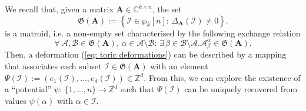 \documentclass[10pt]{article}
\theoremstyle{remark}%
\theoremstyle{definition}%
\begin{document}
We recall that, given a matrix $\mathbf{A}\in\mathbb{C}^{k\times n}$, the set 
 \begin{equation}
\mathfrak{G}(\mathbf{A}):=\left\{ \mathcal{I}\in\wp_{k}[n]:\,\Delta_{\mathbf{A}}(\mathcal{I})\neq0\right\}.
\label{eq: set of non-vanishing minors}
 \end{equation}
is a matroid, i.e. a non-empty set characterised by the following exchange relation \citep{Oxley2006} 
 \begin{equation}
\forall\,\mathcal{A},\mathcal{B}\in\mathfrak{G}(\mathbf{A}),\,\alpha\in\mathcal{A}\setminus\mathcal{B}:\,\exists\,\beta\in\mathcal{B}\setminus\mathcal{A}.\mathcal{A}_{\beta}^{\alpha}\in\mathfrak{G}(\mathbf{A}).
\label{eq: exchange relation}
 \end{equation}
Then, a deformation (\ref{eq: toric deformations}) can be described by a mapping that associates each subset $\mathcal{I}\in\mathfrak{G}(\mathbf{A})$ with an element $\Psi(\mathcal{I}):=(e_{1}(\mathcal{I}),\dots,e_{d}(\mathcal{I}))\in\mathbb{Z}^{d}$. From this, we can explore 
the existence of a ``potential''  $\psi:\,\{1,\dots,n\}\longrightarrow\mathbb{Z}^{d}$ such that $\Psi(\mathcal{I})$ can be uniquely recovered from values $\psi(\alpha)$ with $\alpha\in\mathcal{I}$. 
\end{document}
